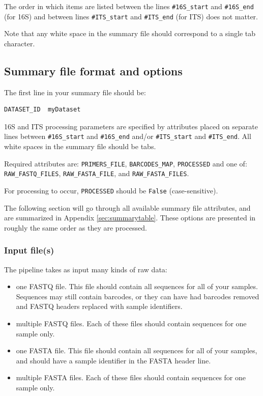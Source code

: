 \documentclass[11pt, oneside]{article}   	%
\begin{document}
The order in which items are listed between the lines {\tt \#16S\_start} and {\tt \#16S\_end} 
(for 16S) and between lines {\tt \#ITS\_start} and {\tt \#ITS\_end} (for ITS) does not matter.  

Note that any white space in the summary file should correspond to a single tab character.

\subsection{Summary file format and options}

The first line in your summary file should be:

\begin{verbatim}
DATASET_ID	myDataset
\end{verbatim}

16S and ITS processing parameters are specified by attributes placed
on separate lines between \texttt{\#16S\_start} and \texttt{\#16S\_end}
and/or \texttt{\#ITS\_start} and \texttt{\#ITS\_end}. All white spaces in the
summary file should be tabs.

Required attributes are: \texttt{PRIMERS\_FILE}, \texttt{BARCODES\_MAP}, \texttt{PROCESSED} and
one of: \texttt{RAW\_FASTQ\_FILES}, \texttt{RAW\_FASTA\_FILE}, and \texttt{RAW\_FASTA\_FILES}.

For processing to occur,  \texttt{PROCESSED} should be \texttt{False} (case-sensitive).

The following section will go through all available summary file attributes, and
are summarized in Appendix \ref{sec:summarytable}.
These options are presented in roughly the same order as they
are processed.

\subsubsection{Input file(s)}

The pipeline takes as input many kinds of raw data:

\begin{itemize}
	\item one FASTQ file. This file should contain all sequences for all of your 
	samples. Sequences may still contain barcodes, or they can have had barcodes
	removed and FASTQ headers replaced with sample identifiers.
	\item multiple FASTQ files. Each of these files should contain sequences for
	one sample only. 
	\item one FASTA file. This file should contain all sequences for all of your 
	samples, and should have a sample identifier in the FASTA header line.
	\item multiple FASTA files. Each of these files should contain sequences for 
	one sample only.
\end{itemize}
\end{document}
